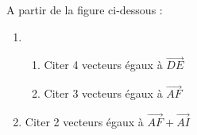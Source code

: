 
%
A partir de la figure ci-dessous :
\\
\begin{center}
\end{center}
\begin{enumerate}
     \item
     \begin{enumerate}[label=\alph*.]
          \item
          Citer 4 vecteurs égaux à $\overrightarrow{DE}$
          \item
     Citer 3 vecteurs égaux à $\overrightarrow{AF}$
\end{enumerate}
     \item
Citer 2 vecteurs égaux à $\overrightarrow{AF} + \overrightarrow{AI}$
\end{enumerate}
